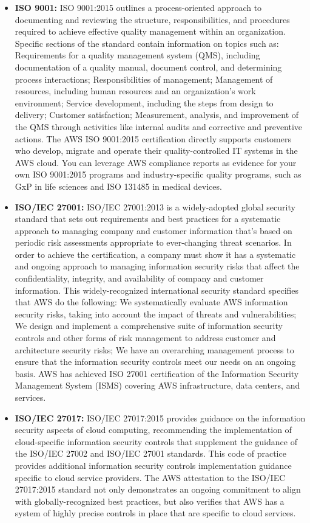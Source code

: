 \begin{itemize}
    \item \textbf{ISO 9001: } ISO 9001:2015 outlines a process-oriented approach to documenting and reviewing the structure, responsibilities, and procedures required to achieve effective quality management within an organization. Specific sections of the standard contain information on topics such as: Requirements for a quality management system (QMS), including documentation of a quality manual, document control, and determining process interactions; Responsibilities of management; Management of resources, including human resources and an organization's work environment; Service development, including the steps from design to delivery; Customer satisfaction; Measurement, analysis, and improvement of the QMS through activities like internal audits and corrective and preventive actions. The AWS ISO 9001:2015 certification directly supports customers who develop, migrate and operate their quality-controlled IT systems in the AWS cloud. You can leverage AWS compliance reports as evidence for your own ISO 9001:2015 programs and industry-specific quality programs, such as GxP in life sciences and ISO 131485 in medical devices. 
    \item \textbf{ISO/IEC 27001: } ISO/IEC 27001:2013 is a widely-adopted global security standard that sets out requirements and best practices for a systematic approach to managing company and customer information that's based on periodic risk assessments appropriate to ever-changing threat scenarios. In order to achieve the certification, a company must show it has a systematic and ongoing approach to managing information security risks that affect the confidentiality, integrity, and availability of company and customer information. This widely-recognized international security standard specifies that AWS do the following: We systematically evaluate AWS information security risks, taking into account the impact of threats and vulnerabilities; We design and implement a comprehensive suite of information security controls and other forms of risk management to address customer and architecture security risks; We have an overarching management process to ensure that the information security controls meet our needs on an ongoing basis. AWS has achieved ISO 27001 certification of the Information Security Management System (ISMS) covering AWS infrastructure, data centers, and services.
    \item \textbf{ISO/IEC 27017: } ISO/IEC 27017:2015 provides guidance on the information security aspects of cloud computing, recommending the implementation of cloud-specific information security controls that supplement the guidance of the ISO/IEC 27002 and ISO/IEC 27001 standards. This code of practice provides additional information security controls implementation guidance specific to cloud service providers. The AWS attestation to the ISO/IEC 27017:2015 standard not only demonstrates an ongoing commitment to align with globally-recognized best practices, but also verifies that AWS has a system of highly precise controls in place that are specific to cloud services.

\end{itemize}
